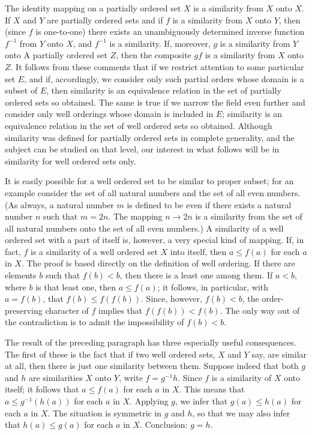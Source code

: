 The identity mapping on a partially ordered set $X$ is a similarity from $X$ onto $X$. If $X$ and $Y$ are partially ordered sets and if $f$ is a similarity from $X$ onto $Y$, then (since $f$ is one-to-one) there exists an unambiguously determined inverse function $f^{-1}$ from $Y$ onto $X$, and $f^{-1}$ is a similarity. If, moreover, $g$ is a similarity from $Y$ onto A partially ordered set $Z$, then the composite $gf$ is a similarity from $X$ onto $Z$. It follows from these comments that if we restrict attention to some particular set $E$, and if, accordingly, we consider only such partial orders whose domain is a subset of $E$, then similarity is an equivalence relation in the set of partially ordered sets so obtained. The same is true if we narrow the field even further and consider only well orderings whose domain is included in $E$; similarity is an equivalence relation in the set of well ordered sets so obtained. Although similarity was defined for partially ordered sets in complete generality, and the subject can be studied on that level, our interest in what follows will be in similarity for well ordered sets only. 

It is easily possible for a well ordered set to be similar to proper subset; for an example consider the set of all natural numbers and the set of all even numbers. (As always, a natural number $m$ is defined to be even if there exists a natural number $n$ such that $m = 2n$. The mapping $n \rightarrow 2n$ is a similarity from the set of all natural numbers onto the set of all even numbers.) A similarity of a well ordered set with a part of itself is, however, a very special kind of mapping. If, in fact, $f$ is a similarity of a well ordered set $X$ into itself, then $a \le f(a)$ for each $a$ in $X$. The proof is based directly on the definition of well ordering. If there are elements $b$ such that $f(b) < b$, then there is a least one among them. If $a < b$, where $b$ is that least one, then $a \le f(a)$; it follows, in particular, with $a = f(b)$, that $f(b) \le f(f(b))$. Since, however, $f(b) < b$, the order-preserving character of $f$ implies that $f(f(b)) < f(b)$. The only way out of the contradiction is to admit the impossibility of $f(b) < b$. 

The result of the preceding paragraph has three especially useful consequences. The first of these is the fact that if two well ordered sets, $X$ and $Y$ say, are similar at all, then there is just one similarity between them. Suppose indeed that both $g$ and $h$ are similarities $X$ onto $Y$, write $f = g^{-1}h$. Since $f$ is a similarity of $X$ onto itself; it follows that $a \le f(a)$ for each $a$ in $X$. This means that $a \le g^{-1}(h(a))$ for each $a$ in $X$. Applying $g$, we infer that $g(a) \le h(a)$ for each $a$ in $X$. The situation is symmetric in $g$ and $h$, so that we may also infer that $h(a) \le g(a)$ for each $a$ in $X$. Conclusion: $g = h$. 

